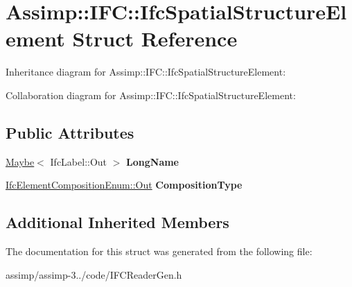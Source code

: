 \hypertarget{struct_assimp_1_1_i_f_c_1_1_ifc_spatial_structure_element}{\section{Assimp\+:\+:I\+F\+C\+:\+:Ifc\+Spatial\+Structure\+Element Struct Reference}
\label{struct_assimp_1_1_i_f_c_1_1_ifc_spatial_structure_element}
}


Inheritance diagram for Assimp\+:\+:I\+F\+C\+:\+:Ifc\+Spatial\+Structure\+Element\+:


Collaboration diagram for Assimp\+:\+:I\+F\+C\+:\+:Ifc\+Spatial\+Structure\+Element\+:
\subsection*{Public Attributes}
\begin{DoxyCompactItemize}
\item 
\hypertarget{struct_assimp_1_1_i_f_c_1_1_ifc_spatial_structure_element_af676477ae3127bfead09321b2ebdd242}{\hyperlink{struct_assimp_1_1_s_t_e_p_1_1_maybe}{Maybe}$<$ Ifc\+Label\+::\+Out $>$ {\bfseries Long\+Name}}\label{struct_assimp_1_1_i_f_c_1_1_ifc_spatial_structure_element_af676477ae3127bfead09321b2ebdd242}

\item 
\hypertarget{struct_assimp_1_1_i_f_c_1_1_ifc_spatial_structure_element_af4a2b876d6f242cf99492bb07b23eef7}{\hyperlink{classboost_1_1shared__ptr}{Ifc\+Element\+Composition\+Enum\+::\+Out} {\bfseries Composition\+Type}}\label{struct_assimp_1_1_i_f_c_1_1_ifc_spatial_structure_element_af4a2b876d6f242cf99492bb07b23eef7}

\end{DoxyCompactItemize}
\subsection*{Additional Inherited Members}


The documentation for this struct was generated from the following file\+:\begin{DoxyCompactItemize}
\item 
assimp/assimp-\/3../code/I\+F\+C\+Reader\+Gen.\+h\end{DoxyCompactItemize}
